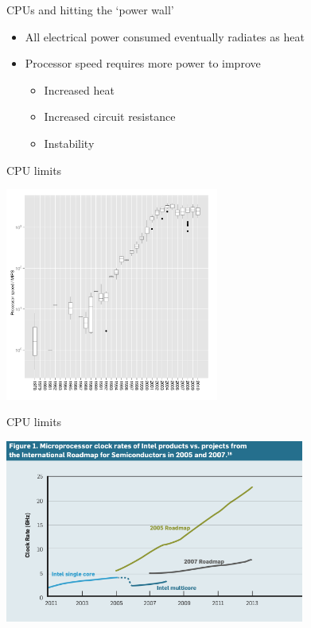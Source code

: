 \documentclass{beamer}
\begin{document}
\begin{frame}{CPUs and hitting the `power wall'}
\begin{itemize}
\item All electrical power consumed eventually radiates as heat
\item Processor speed requires more power to improve
\begin{itemize}
\item Increased heat
\item Increased circuit resistance
\item Instability
\end{itemize}
\end{itemize}
\end{frame}

\begin{frame}{CPU limits}
\begin{center}
\includegraphics[height=7cm]{clockspeed.pdf}
\end{center}
\end{frame}

\begin{frame}{CPU limits}
\begin{center}
\includegraphics[height=6cm]{clockrates.png}
\end{center}
\end{frame}
\end{document}
